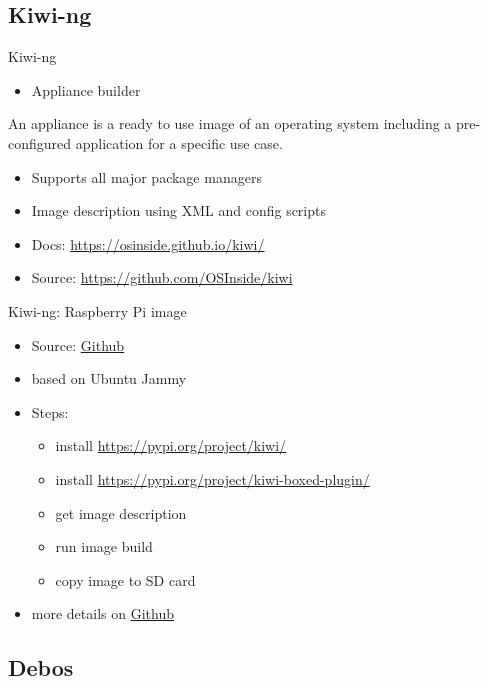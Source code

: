 \documentclass{beamer}
\begin{document}
\subsection{Kiwi-ng}

\begin{frame}{Kiwi-ng}
	\begin{itemize}
		\item Appliance builder
	\end{itemize}
	\begin{definition} 
		An appliance is a ready to use image of an operating system including a pre-configured application for a specific use case. 
	\end{definition}
	\begin{itemize}
		\item Supports all major package managers
		\item Image description using XML and config scripts
		\item Docs: \url{https://osinside.github.io/kiwi/}
		\item Source: \url{https://github.com/OSInside/kiwi}
	\end{itemize}
\end{frame}

\begin{frame}{Kiwi-ng: Raspberry Pi image}
	\begin{itemize}
		\item Source: \href{https://github.com/OSInside/kiwi-descriptions/tree/main/ubuntu/aarch64/ubuntu-jammy-rpi}{Github}
		\item based on Ubuntu Jammy
		\item Steps:
		\begin{itemize}
			\item install \url{https://pypi.org/project/kiwi/}
			\item install \url{https://pypi.org/project/kiwi-boxed-plugin/}
			\item get image description
			\item run image build
			\item copy image to SD card
		\end{itemize}
		\item more details on \href{https://github.com/tomirgang/eh21_maintainable_linux/tree/main/examples/first_build_rpi4/kiwi-ng}{Github}
	\end{itemize}
\end{frame}

\subsection{Debos}
\end{document}

